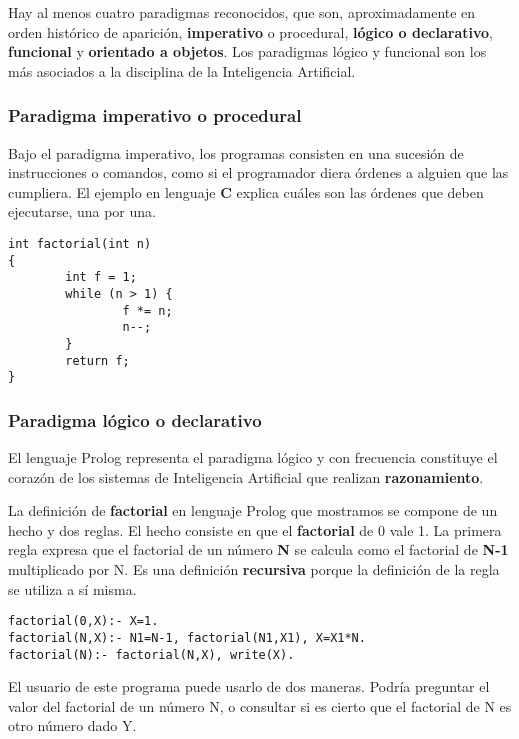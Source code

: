 \documentclass[spanish,a4paper,]{article}
\begin{document}
Hay al menos cuatro paradigmas reconocidos, que son, aproximadamente en
orden histórico de aparición, \textbf{imperativo} o procedural,
\textbf{lógico o declarativo}, \textbf{funcional} y \textbf{orientado a
objetos}. Los paradigmas lógico y funcional son los más asociados a la
disciplina de la Inteligencia Artificial.

\hypertarget{paradigma-imperativo-o-procedural}{%
\subsubsection{Paradigma imperativo o
procedural}\label{paradigma-imperativo-o-procedural}}

Bajo el paradigma imperativo, los programas consisten en una sucesión de
instrucciones o comandos, como si el programador diera órdenes a alguien
que las cumpliera. El ejemplo en lenguaje \textbf{C} explica cuáles son
las órdenes que deben ejecutarse, una por una.

\begin{verbatim}
int factorial(int n)
{
        int f = 1;
        while (n > 1) {
                f *= n;
                n--;
        }
        return f;
}
\end{verbatim}

\hypertarget{paradigma-luxf3gico-o-declarativo}{%
\subsubsection{Paradigma lógico o
declarativo}\label{paradigma-luxf3gico-o-declarativo}}

El lenguaje Prolog representa el paradigma lógico y con frecuencia
constituye el corazón de los sistemas de Inteligencia Artificial que
realizan \textbf{razonamiento}.

La definición de \textbf{factorial} en lenguaje Prolog que mostramos se
compone de un hecho y dos reglas. El hecho consiste en que el
\textbf{factorial} de 0 vale 1. La primera regla expresa que el
factorial de un número \textbf{N} se calcula como el factorial de
\textbf{N-1} multiplicado por N. Es una definición \textbf{recursiva}
porque la definición de la regla se utiliza a sí misma.

\begin{verbatim}
factorial(0,X):- X=1.
factorial(N,X):- N1=N-1, factorial(N1,X1), X=X1*N.
factorial(N):- factorial(N,X), write(X).
\end{verbatim}

El usuario de este programa puede usarlo de dos maneras. Podría
preguntar el valor del factorial de un número N, o consultar si es
cierto que el factorial de N es otro número dado Y.
\end{document}
